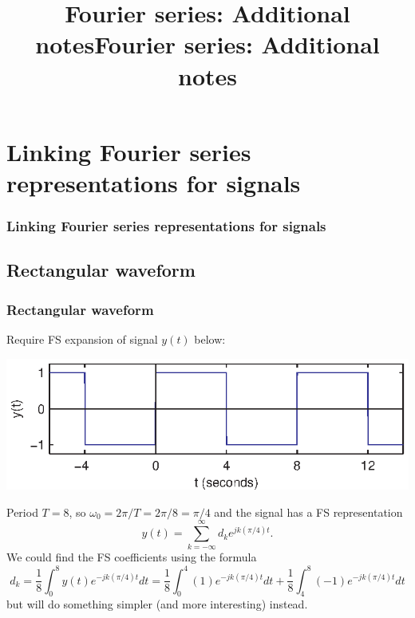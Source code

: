 \documentclass[10pt]{beamer}
\title{Fourier series: Additional notes}
\author{}
\date{}
\begin{document}
\mode*  %

\begin{frame}
\titlepage
\end{frame}


\title{Fourier series: Additional notes}
\author{}
\date{}

\section{Linking Fourier series representations for signals}
\begin{frame}
  \frametitle<presentation>{Linking Fourier series representations for signals}
\end{frame}

\begin{frame}
\subsection{Rectangular waveform}
\frametitle<presentation>{Rectangular waveform}

Require FS expansion of signal $y(t)$ below:
\begin{center}
  \includegraphics{fs_add_fig02}
\end{center}
Period $T=8$, so $\omega_0 = 2\pi/T = 2\pi/8 = \pi/4$ and the signal has a FS 
representation 
\begin{equation*}
  y(t) = \sum_{k=-\infty}^\infty d_k e^{j k (\pi/4) t}.
\end{equation*}
We could find the FS coefficients using the formula
\begin{equation*}
	d_k = \frac{1}{8} \int_0^8 y(t) e^{-j k (\pi/4) t} dt 
	= \frac{1}{8} \int_0^4 (1) e^{-j k (\pi/4) t} dt + \frac{1}{8} \int_4^8 (-1) e^{-j k (\pi/4) t} dt
\end{equation*}
but will do something simpler (and more interesting) instead.
\end{frame}
\end{document}
